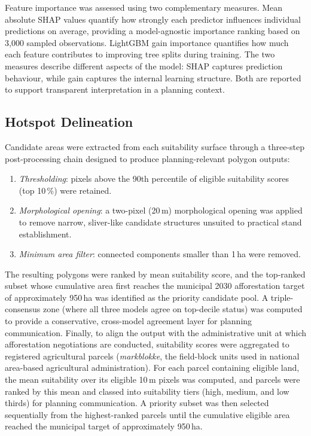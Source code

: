\documentclass[land,article,submit,moreauthors]{Definitions/mdpi}
\begin{document}
Feature importance was assessed using two complementary measures. Mean absolute SHAP values \citep{lundberg2017shap} quantify how strongly each predictor influences individual predictions on average, providing a model-agnostic importance ranking based on 3{,}000 sampled observations. LightGBM gain importance quantifies how much each feature contributes to improving tree splits during training. The two measures describe different aspects of the model: SHAP captures prediction behaviour, while gain captures the internal learning structure. Both are reported to support transparent interpretation in a planning context.

\subsection{Hotspot Delineation}
\label{sec:hotspots}

Candidate areas were extracted from each suitability surface through a three-step post-processing chain designed to produce planning-relevant polygon outputs:

\begin{enumerate}
    \item \textit{Thresholding}: pixels above the 90th percentile of eligible suitability scores (top 10\,\%) were retained.
    \item \textit{Morphological opening}: a two-pixel (20\,m) morphological opening was applied to remove narrow, sliver-like candidate structures unsuited to practical stand establishment.
    \item \textit{Minimum area filter}: connected components smaller than 1\,ha were removed.
\end{enumerate}

The resulting polygons were ranked by mean suitability score, and the top-ranked subset whose cumulative area first reaches the municipal 2030 afforestation target of approximately 950\,ha \citep{viborg2022} was identified as the priority candidate pool. A triple-consensus zone (where all three models agree on top-decile status) was computed to provide a conservative, cross-model agreement layer for planning communication. Finally, to align the output with the administrative unit at which afforestation negotiations are conducted, suitability scores were aggregated to registered agricultural parcels (\textit{markblokke}, the field-block units used in national area-based agricultural administration). For each parcel containing eligible land, the mean suitability over its eligible 10\,m pixels was computed, and parcels were ranked by this mean and classed into suitability tiers (high, medium, and low thirds) for planning communication. A priority subset was then selected sequentially from the highest-ranked parcels until the cumulative eligible area reached the municipal target of approximately 950\,ha.
\end{document}
